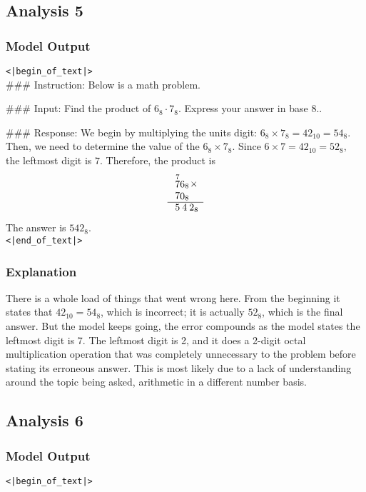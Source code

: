 \subsection{Analysis 5}
\subsubsection{Model Output} 
\texttt{<|begin\_of\_text|>} \\

\#\#\# Instruction: Below is a math problem.

\#\#\# Input: Find the product of $6_8 \cdot 7_8.$ Express your answer in base $8.$.

\#\#\# Response: We begin by multiplying the units digit: $6_8 \times 7_8 = 42_{10} = 54_8.$ Then, we need to determine the value of the $6_8 \times 7_8.$ Since $6 \times 7 = 42_{10} = 52_8,$ the leftmost digit is $7.$ Therefore, the product is $$\begin{array}{c@{}c@{\;}c@{}c@{}c@{}c} & & & \stackrel{7}{7} & \stackrel{}{6}_8 & \times \\ & & & 7 & \stackrel{}{0}_8 & \\ \cline{1-6} & & & 5 & 4 & 2_8 \\ \end{array}$$ The answer is $\boxed{542_8}.$ 
\\\texttt{<|end\_of\_text|>}

\subsubsection{Explanation}
There is a whole load of things that went wrong here. From the beginning it states that $42_{10}=54_8$, which is incorrect; it is actually $52_8$, which is the final answer. But the model keeps going, the error compounds as the model states the leftmost digit is 7. The leftmost digit is 2, and it does a 2-digit octal multiplication operation that was completely unnecessary to the problem before stating its erroneous answer. This is most likely due to a lack of understanding around the topic being asked, arithmetic in a different number basis. 

\subsection{Analysis 6}
\subsubsection{Model Output}
\texttt{<|begin\_of\_text|>} \\

